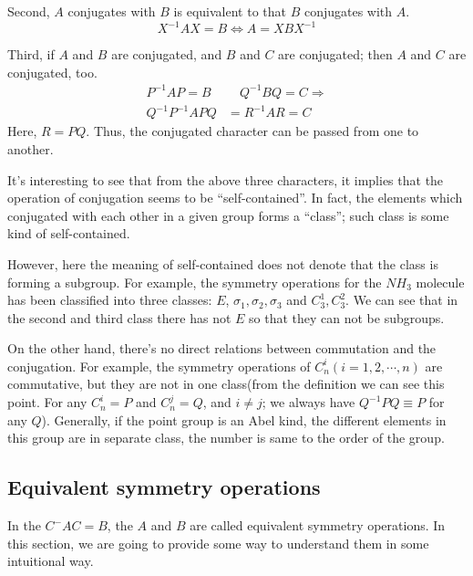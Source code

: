 Second, $A$ conjugates with $B$ is equivalent to that $B$ conjugates
with $A$.
\begin{equation}\label{}
  X^{-1}AX = B \Leftrightarrow A = XBX^{-1}
\end{equation}

Third, if $A$ and $B$ are conjugated, and $B$ and $C$ are conjugated;
then $A$ and $C$ are conjugated, too.
\begin{align}\label{}
  P^{-1}AP = B  & \quad  Q^{-1}BQ = C \Rightarrow \nonumber \\
  Q^{-1}P^{-1}APQ &= R^{-1}AR = C
\end{align}
Here, $R = PQ$. Thus, the conjugated character can be passed from one
to another.

It's interesting to see that from the above three characters, it
implies that the operation of conjugation seems to be
``self-contained''. In fact, the elements which conjugated with each
other in a given group forms a ``class''; such class is some kind of
self-contained.

However, here the meaning of self-contained does not denote that the
class is forming a subgroup. For example, the symmetry operations for
the $NH_{3}$ molecule has been classified into three classes: $E$,
$\sigma_{1}, \sigma_{2},\sigma_{3}$ and $C^{1}_{3}, C^{2}_{3}$.  We
can see that in the second and third class there has not $E$ so that
they can not be subgroups.

On the other hand, there's no direct relations between commutation and
the conjugation. For example, the symmetry operations of $C^{i}_{n}
(i=1,2,\cdots,n)$ are commutative, but they are not in one class(from
the definition we can see this point. For any $C^{i}_{n} = P$ and
$C^{j}_{n} = Q$, and $i \neq j$; we always have $Q^{-1}PQ \equiv P$
for any $Q$). Generally, if the point group is an Abel kind, the
different elements in this group are in separate class, the number is
same to the order of the group.

\subsection{Equivalent symmetry operations}
%
%
%
%
In the $C^{-}AC=B$, the $A$ and $B$ are called equivalent symmetry
operations. In this section, we are going to provide some way to
understand them in some intuitional way.

